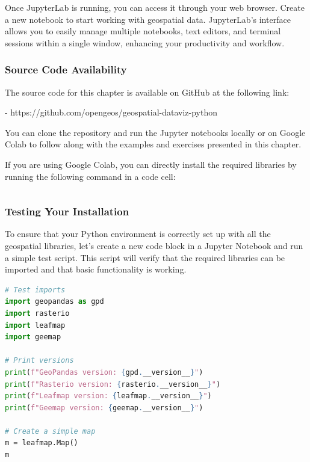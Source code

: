 Once JupyterLab is running, you can access it through your web browser. Create a new notebook to start working with geospatial data. JupyterLab's interface allows you to easily manage multiple notebooks, text editors, and terminal sessions within a single window, enhancing your productivity and workflow.

\subsubsection{Source Code Availability}

The source code for this chapter is available on GitHub at the following link:

- https://github.com/opengeos/geospatial-dataviz-python

You can clone the repository and run the Jupyter notebooks locally or on Google Colab to follow along with the examples and exercises presented in this chapter.

If you are using Google Colab, you can directly install the required libraries by running the following command in a code cell:

\begin{lstlisting}[language=Python]
%pip install geopandas rasterio leafmap geemap maplibre fiona localtileserver mapclassify kaleido
\end{lstlisting}

\subsubsection{Testing Your Installation}

To ensure that your Python environment is correctly set up with all the geospatial libraries, let's create a new code block in a Jupyter Notebook and run a simple test script. This script will verify that the required libraries can be imported and that basic functionality is working.

\begin{lstlisting}[language=Python]
# Test imports
import geopandas as gpd
import rasterio
import leafmap
import geemap

# Print versions
print(f"GeoPandas version: {gpd.__version__}")
print(f"Rasterio version: {rasterio.__version__}")
print(f"Leafmap version: {leafmap.__version__}")
print(f"Geemap version: {geemap.__version__}")

# Create a simple map
m = leafmap.Map()
m
\end{lstlisting}

